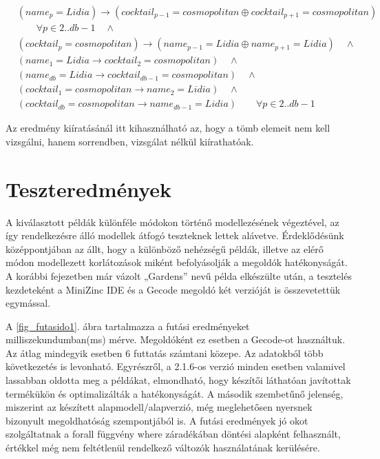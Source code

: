 \documentclass[12pt,a4paper,twoside, openright]{report}
\begin{document}
    \begin{equation}
    \begin{aligned}
     &(name_p=Lidia) \rightarrow (cocktail_{p-1}=cosmopolitan \oplus cocktail_{p+1}=cosmopolitan) \\ 
     &\quad \quad \forall  p \in 2..db-1 \quad \wedge \\
   	 &(cocktail_p=cosmopolitan) \rightarrow (name_{p-1}=Lidia \oplus name_{p+1}=Lidia) \quad  \wedge \\
     &(name_1=Lidia \rightarrow cocktail_2=cosmopolitan) \quad \wedge \\
     &(name_{db}=Lidia \rightarrow cocktail_{db-1}=cosmopolitan) \quad \wedge \\
     &(cocktail_1= cosmopolitan \rightarrow name_2=Lidia) \quad \wedge \\
     &(cocktail_{db}=cosmopolitan \rightarrow name_{db-1}=Lidia) \quad \quad \forall p \in 2..db-1
     \end{aligned}
    \end{equation} 
     
     

    Az eredmény kiíratásánál itt kihasználható az, hogy a tömb elemeit nem kell vizsgálni, hanem sorrendben, vizsgálat nélkül kiírathatóak.


\section{Teszteredmények}

    A kiválasztott példák különféle módokon történő modellezésének végeztével, az így rendelkezésre álló modellek átfogó teszteknek lettek alávetve.
    Érdeklődésünk középpontjában az állt, hogy a különböző nehézségű példák, illetve az elérő módon modellezett korlátozások miként befolyásolják a megoldók hatékonyságát.
    A korábbi fejezetben már vázolt „Gardens” nevű példa elkészülte után, a tesztelés kezdeteként a MiniZinc IDE és a Gecode megoldó két verzióját is összevetettük egymással.


    A \ref{fig_futasido1}. ábra tartalmazza a futási eredményeket milliszekundumban(ms) mérve.
    Megoldóként ez esetben a Gecode-ot használtuk.
    Az átlag mindegyik esetben 6 futtatás számtani közepe.
    Az adatokból több következetés is levonható.
    Egyrészről, a 2.1.6-os verzió minden esetben valamivel lassabban oldotta meg a példákat, elmondható, hogy készítői láthatóan javítottak termékükön és optimalizálták a hatékonyságát.
    A második szembetűnő jelenség, miszerint az készített alapmodell/alapverzió, még meglehetősen nyersnek bizonyult megoldhatóság szempontjából is.
    A futási eredmények jó okot szolgáltatnak a forall függvény where záradékában döntési alapként felhasznált, értékkel még nem feltétlenül rendelkező változók használatának kerülésére.
\end{document}
